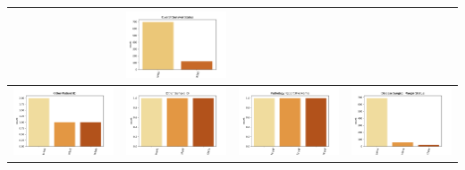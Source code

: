 \begin{center}
\begin{tabular}{ |c|c|c|c| }
		& \includegraphics[width=.25\textwidth]{NOTEBOOK/IMAGENES_CRUDAS/80} 
		\\  \hline
		\includegraphics[width=.25\textwidth]{NOTEBOOK/IMAGENES_CRUDAS/81} 
		& \includegraphics[width=.25\textwidth]{NOTEBOOK/IMAGENES_CRUDAS/82} 
		& \includegraphics[width=.25\textwidth]{NOTEBOOK/IMAGENES_CRUDAS/83} 
		& \includegraphics[width=.25\textwidth]{NOTEBOOK/IMAGENES_CRUDAS/84} 
		\\  \hline           
	\end{tabular} 
\end{center} 

